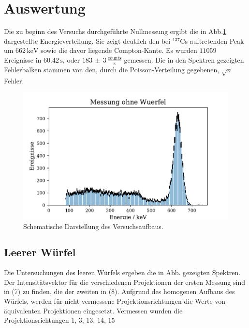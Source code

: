 \section{Auswertung}
Die zu beginn des Versuchs durchgeführte Nullmessung ergibt die in Abb.\ref{Leermessung} dargestellte Energieverteilung. Sie zeigt deutlich den bei $^{137}$Cs auftretenden Peak um $662 \, \si{\kilo\electronvolt}$ sowie die davor liegende
Compton-Kante. Es wurden $11059$ Ereignisse in $60.42 \, \si{\second}$, oder $183 \,  \pm \, 3\, \frac{\text{counts}}{\si{\second}}$ gemessen.
Die in den Spektren gezeigten Fehlerbalken stammen von den, durch die Poisson-Verteilung gegebenen, $\sqrt{n}$ Fehler.
\begin{figure}[H]
  \centering
  \includegraphics{plots/leer.pdf}
  \caption{Schematische Darstellung des Versuchsaufbaus.\cite{anleitung}}
  \label{Leermessung}
\end{figure}
\subsection{Leerer Würfel}
Die Untersuchungen des leeren Würfels ergeben die in Abb. gezeigten Spektren. Der Intensitätsvektor
für die verschiedenen Projektionen der ersten Messung sind in (7) zu finden, die der zweiten in (8).
Aufgrund des homogenen Aufbaus des Würfels,
werden für nicht vermessene Projektionsrichtungen die Werte von äquivalenten Projektionen eingesetzt.
Vermessen wurden die Projektionsrichtungen 1, 3, 13, 14, 15

